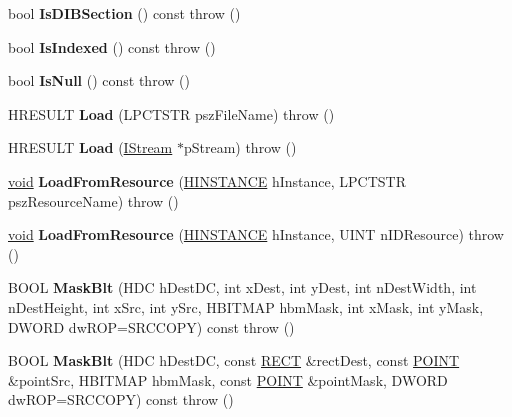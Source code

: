 \begin{DoxyCompactItemize}
bool {\bfseries Is\+D\+I\+B\+Section} () const  throw ()
\item 
\mbox{\label{class_a_t_l_1_1_c_image_aa9ed326f2176fdaa2fa30c960c512bf9}} 
bool {\bfseries Is\+Indexed} () const  throw ()
\item 
\mbox{\label{class_a_t_l_1_1_c_image_ab287f70c4c66ac616e607deb714f9def}} 
bool {\bfseries Is\+Null} () const  throw ()
\item 
\mbox{\label{class_a_t_l_1_1_c_image_a20cc822e23bb1f422aa88cd2457b36c2}} 
H\+R\+E\+S\+U\+LT {\bfseries Load} (L\+P\+C\+T\+S\+TR psz\+File\+Name)  throw ()
\item 
\mbox{\label{class_a_t_l_1_1_c_image_a56c6c1ed850d84e6dcc491e5e8946b1b}} 
H\+R\+E\+S\+U\+LT {\bfseries Load} (\hyperlink{interface_i_stream}{I\+Stream} $\ast$p\+Stream)  throw ()
\item 
\mbox{\label{class_a_t_l_1_1_c_image_a15da9a4cfc91a0eb542c7395926b0bf2}} 
\hyperlink{interfacevoid}{void} {\bfseries Load\+From\+Resource} (\hyperlink{interfacevoid}{H\+I\+N\+S\+T\+A\+N\+CE} h\+Instance, L\+P\+C\+T\+S\+TR psz\+Resource\+Name)  throw ()
\item 
\mbox{\label{class_a_t_l_1_1_c_image_ace24f1e35b53b3db8cd78d387b085106}} 
\hyperlink{interfacevoid}{void} {\bfseries Load\+From\+Resource} (\hyperlink{interfacevoid}{H\+I\+N\+S\+T\+A\+N\+CE} h\+Instance, U\+I\+NT n\+I\+D\+Resource)  throw ()
\item 
\mbox{\label{class_a_t_l_1_1_c_image_a6c3b70ebaa76844c410fa619b0c5df9e}} 
B\+O\+OL {\bfseries Mask\+Blt} (H\+DC h\+Dest\+DC, int x\+Dest, int y\+Dest, int n\+Dest\+Width, int n\+Dest\+Height, int x\+Src, int y\+Src, H\+B\+I\+T\+M\+AP hbm\+Mask, int x\+Mask, int y\+Mask, D\+W\+O\+RD dw\+R\+OP=S\+R\+C\+C\+O\+PY) const  throw ()
\item 
\mbox{\label{class_a_t_l_1_1_c_image_ac2085e4ce68e43564585b0d2f4f76eb3}} 
B\+O\+OL {\bfseries Mask\+Blt} (H\+DC h\+Dest\+DC, const \hyperlink{structtag_r_e_c_t}{R\+E\+CT} \&rect\+Dest, const \hyperlink{structtag_p_o_i_n_t}{P\+O\+I\+NT} \&point\+Src, H\+B\+I\+T\+M\+AP hbm\+Mask, const \hyperlink{structtag_p_o_i_n_t}{P\+O\+I\+NT} \&point\+Mask, D\+W\+O\+RD dw\+R\+OP=S\+R\+C\+C\+O\+PY) const  throw ()

\end{DoxyCompactItemize}
